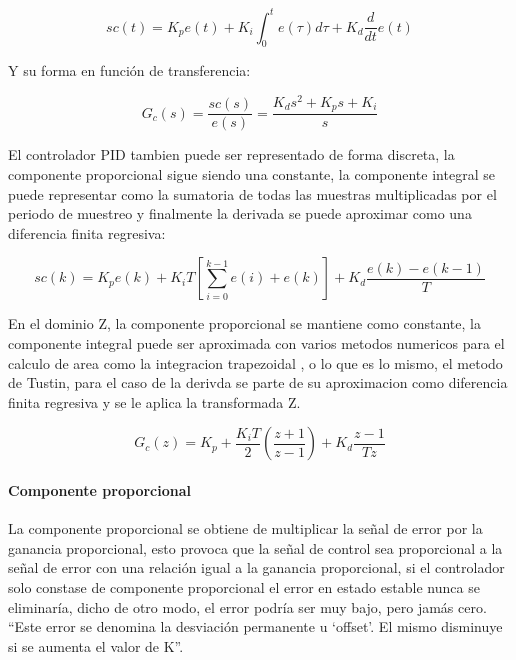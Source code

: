             \begin{equation}\label{eq:pidtiempo}
                sc(t) = K_{p}e(t)+  K_{i}\int_{0}^{t} e(\tau) d\tau + K_{d} \frac{d}{dt}e(t)
            \end{equation}
            
            \noindent Y su forma en función de transferencia:
            
            \begin{equation}\label{eq:pidcompleja}
                G_{c}(s) = \frac{sc(s)}{e(s)} = \frac{K_{d}s^{2} + K_{p}s +  K_{i}}{s}
            \end{equation}
            
            El controlador PID tambien puede ser representado de forma discreta, la componente proporcional sigue siendo una constante, la componente integral se puede representar como la sumatoria de todas las muestras multiplicadas por el periodo de muestreo y finalmente la derivada se puede aproximar como una diferencia finita regresiva:

            \begin{equation}\label{eq:pidcdiscreto}
                sc(k) = K_{p}e(k)+  K_{i}T\left[\sum_{i=0}^{k-1} e(i) + e(k)\right] + K_{d} \frac{e(k)- e(k-1)}{T}
            \end{equation}

            En el dominio Z, la componente proporcional se mantiene como constante, la componente integral puede ser aproximada con varios metodos numericos para el calculo de area como la integracion trapezoidal \Parencite{kuo1996sistemas}, o lo que es lo mismo, el metodo de Tustin, para el caso de la derivda se parte de su aproximacion como diferencia finita regresiva y se le aplica la transformada Z.

            \begin{equation}\label{eq:pidenZ}
                G_{c}(z) = K_{p} + \frac{K_{i}T}{2}\left(\frac{z+1}{z-1}\right) + K_{d} \frac{z-1}{Tz}
            \end{equation}

            \paragraph{Componente proporcional}

				La componente proporcional se obtiene de multiplicar la señal de error por la ganancia proporcional, esto provoca que la señal de control sea proporcional a la señal de error con una relación igual a la ganancia proporcional, si el controlador solo constase de componente proporcional el error en estado estable nunca se eliminaría, dicho de otro modo, el error podría ser muy bajo, pero jamás cero. \enquote{Este error se denomina la desviación permanente u \enquote{offset}. El mismo disminuye si se aumenta el valor de K}\Parencite[p.$\,$54]{nelson1999fundamentos}.

